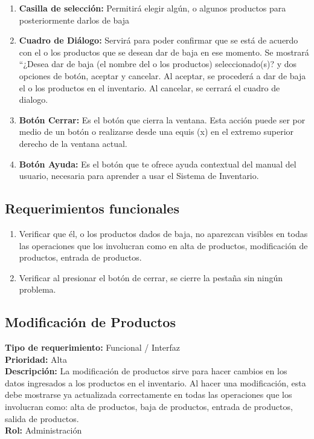 \documentclass[a4paper,DIV=12]{scrreprt}
\begin{document}
\begin{enumerate}
	
	
	\item{\textbf{Casilla de selección:} Permitirá elegir algún, o algunos productos para posteriormente darlos de baja}
	\item{\textbf{Cuadro de Diálogo:} Servirá para poder confirmar que se está de acuerdo con el o los productos que se desean dar de baja en ese momento. Se mostrará “¿Desea dar de baja (el nombre del o los productos) seleccionado(s)? y dos opciones de botón, aceptar y cancelar. Al aceptar, se procederá a dar de baja el o los productos en el inventario. Al cancelar, se cerrará el cuadro de dialogo.}
	\item{\textbf{Botón Cerrar:} Es el botón que cierra la ventana. Esta acción puede ser por medio de un botón o realizarse desde una equis (x) en el extremo superior derecho de la ventana actual.}	
	\item{\textbf{Botón Ayuda:} Es el botón que te ofrece ayuda contextual del manual del usuario, necesaria para aprender a usar el Sistema de Inventario.}

\end{enumerate}

\subsection*{Requerimientos funcionales}
\begin{enumerate}
	\item{Verificar que él, o los productos dados de baja, no aparezcan visibles en todas las operaciones que los involucran como en alta de productos, modificación de productos, entrada de productos.}
	\item{Verificar al presionar el botón de cerrar, se cierre la pestaña sin ningún problema. 
}

\end{enumerate}

\newpage
\setcounter{subsection}{-1}
\setcounter{chapter}{1}
\setcounter{section}{3}
\subsection{Modificación de Productos}
\noindent
\textbf{Tipo de requerimiento:} Funcional / Interfaz\\
\textbf{Prioridad:} Alta\\
\textbf{Descripción:} La modificación de productos sirve para hacer cambios en los datos ingresados a los productos en el inventario. Al hacer una modificación, esta debe mostrarse ya actualizada correctamente en todas las operaciones que los involucran como: alta de productos, baja de productos, entrada de productos, salida de productos.\\
\textbf{Rol:} Administración\\
\end{document}
